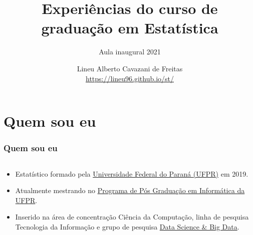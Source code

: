 \documentclass[10pt,
  aspectratio=169,
  serif,
  mathserif,
  professionalfont,
  compress,
  handout,
  ]{beamer}\usepackage[]{graphicx}\usepackage[]{color}
\title[Aula Inaugural]{
  \LARGE Experiências do curso de\\ graduação em Estatística \vspace{0.2cm}}
\subtitle{Aula inaugural 2021}
\author[Lineu Alberto]{%
  Lineu Alberto Cavazani de Freitas \\
  \href{}{https://lineu96.github.io/st/}
}
\institute[UFPR]{}
\date{}
\begin{document}
\frame{
  \titlepage
}






\section{Quem sou eu}

\begin{frame}
\frametitle{Quem sou eu}
\begin{columns}
\begin{column}{0.7\textwidth}
   \begin{itemize}

  \item Estatístico formado pela \href{https://www.ufpr.br/portalufpr/}{Universidade Federal do Paraná (UFPR)} em 2019.

  \item Atualmente mestrando no \href{http://www.prppg.ufpr.br/ppginformatica/?lang=pb}{Programa de Pós Graduação em Informática da UFPR}.

  \item Inserido na área de concentração Ciência da Computação, linha de pesquisa Tecnologia da Informação e grupo de pesquisa \href{https://web.inf.ufpr.br/dsbd/}{Data Science \& Big Data}.
  
  \end{itemize}
  

\end{column}
\end{columns}
\end{frame}
\end{document}
